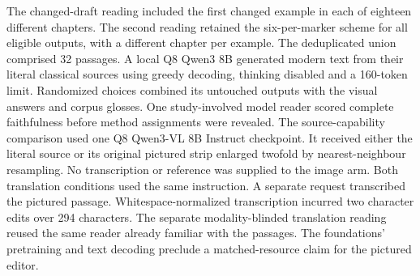 The changed-draft reading included the first changed example in each of eighteen different chapters. The second reading retained the six-per-marker scheme for all eligible outputs, with a different chapter per example. The deduplicated union comprised 32 passages. A local Q8 Qwen3 8B generated modern text from their literal classical sources using greedy decoding, thinking disabled and a 160-token limit. Randomized choices combined its untouched outputs with the visual answers and corpus glosses. One study-involved model reader scored complete faithfulness before method assignments were revealed. The source-capability comparison used one Q8 Qwen3-VL 8B Instruct checkpoint. It received either the literal source or its original pictured strip enlarged twofold by nearest-neighbour resampling. No transcription or reference was supplied to the image arm. Both translation conditions used the same instruction. A separate request transcribed the pictured passage. Whitespace-normalized transcription incurred two character edits over 294 characters. The separate modality-blinded translation reading reused the same reader already familiar with the passages. The foundations' pretraining and text decoding preclude a matched-resource claim for the pictured editor.
